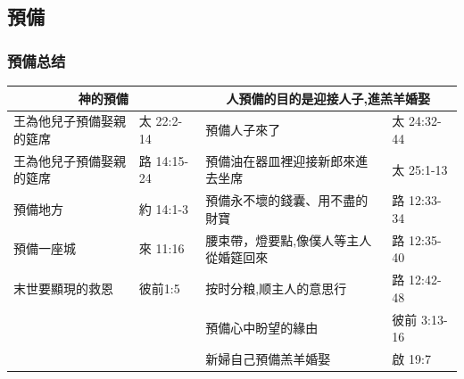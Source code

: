 
\subsection{預備}
\subsubsection{預備总结}
\begin{table}[H]
\centering
\begin{tabular}{l|l|l|l}\hline
\multicolumn{2}{c|}{神的預備} & \multicolumn{2}{c}{人預備的目的是迎接人子,進羔羊婚娶} \\\hline\hline
王為他兒子預備娶親的筵席& 太 22:2-14&預備人子來了& 太 24:32-44\\\hline
王為他兒子預備娶親的筵席& 路 14:15-24&預備油在器皿裡迎接新郎來進去坐席& 太 25:1-13\\\hline
預備地方& 約 14:1-3&預備永不壞的錢囊、用不盡的財寶& 路 12:33-34\\\hline
預備一座城& 來 11:16&腰束帶，燈要點,像僕人等主人從婚筵回來& 路 12:35-40\\\hline
末世要顯現的救恩& 彼前1:5&按时分粮,顺主人的意思行& 路 12:42-48\\\hline
&&預備心中盼望的緣由& 彼前 3:13-16\\\hline
&&新婦自己預備羔羊婚娶& 啟 19:7\\\hline\hline
\end{tabular}
\end{table}
 


